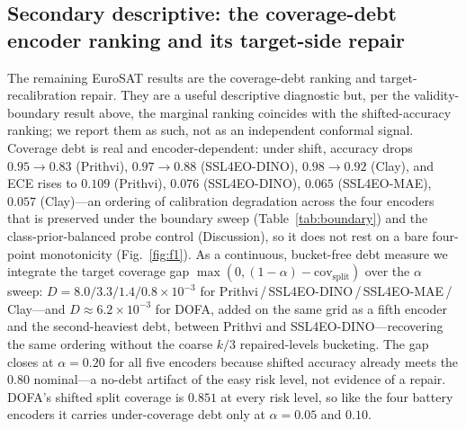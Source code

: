 \documentclass[11pt]{article}
\begin{document}
\subsection*{Secondary descriptive: the coverage-debt encoder ranking and its target-side repair}
The remaining EuroSAT results are the coverage-debt ranking and target-recalibration repair. They are a
useful descriptive diagnostic but, per the validity-boundary result above, the marginal ranking coincides
with the shifted-accuracy ranking; we report them as such, not as an independent conformal signal.
Coverage debt is real and encoder-dependent: under shift, accuracy drops $0.95\to0.83$ (Prithvi),
$0.97\to0.88$ (SSL4EO-DINO), $0.98\to0.92$ (Clay), and ECE rises to $0.109$ (Prithvi),
$0.076$ (SSL4EO-DINO), $0.065$ (SSL4EO-MAE), $0.057$ (Clay)---an ordering of calibration degradation across
the four encoders that is preserved under the boundary sweep (Table~\ref{tab:boundary}) and the
class-prior-balanced probe control (Discussion), so it does not rest on a bare four-point monotonicity
(Fig.~\ref{fig:f1}). As a continuous, bucket-free debt measure we integrate the target coverage gap
$\max(0,(1-\alpha)-\mathrm{cov}_{\mathrm{split}})$ over the $\alpha$ sweep:
$D = 8.0 / 3.3 / 1.4 / 0.8 \times 10^{-3}$ for Prithvi\,/\,SSL4EO-DINO\,/\,SSL4EO-MAE\,/\,Clay---and $D\approx6.2\times10^{-3}$ for DOFA, added on the same grid as a fifth encoder and the second-heaviest debt, between Prithvi and SSL4EO-DINO---recovering the
same ordering without the coarse $k/3$ repaired-levels bucketing. The gap closes at $\alpha=0.20$ for all
five encoders because shifted accuracy already meets the $0.80$ nominal---a no-debt artifact of the
easy risk level, not evidence of a repair. DOFA's shifted split coverage is $0.851$ at every risk level, so
like the four battery encoders it carries under-coverage debt only at $\alpha=0.05$ and $0.10$.
\end{document}
